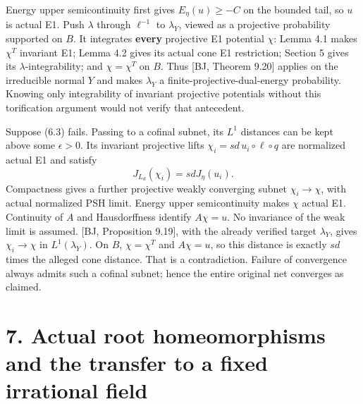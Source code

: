 \documentclass[
  10pt,
]{article}
\begin{document}
Energy upper semicontinuity first gives \(E_\eta(u)\geq-C\) on the
bounded tail, so \(u\) is actual E1. Push \(\lambda\) through
\(\ell^{-1}\) to \(\lambda_Y\), viewed as a projective probability
supported on \(B\). It integrates \textbf{every} projective E1 potential
\(\chi\): Lemma 4.1 makes \(\chi^T\) invariant E1; Lemma 4.2 gives its
actual cone E1 restriction; Section 5 gives its
\(\lambda\)-integrability; and \(\chi=\chi^T\) on \(B\). Thus {[}BJ,
Theorem 9.20{]} applies on the irreducible normal \(Y\) and makes
\(\lambda_Y\) a finite-projective-dual-energy probability. Knowing only
integrability of invariant projective potentials without this
torification argument would not verify that antecedent.

Suppose (6.3) fails. Passing to a cofinal subnet, its \(L^1\) distances
can be kept above some \(\epsilon>0\). Its invariant projective lifts
\(\chi_i=sd\,u_i\circ\ell\circ q\) are normalized actual E1 and satisfy
\[
                         J_{L_d}(\chi_i)=sdJ_\eta(u_i).
\] Compactness gives a further projective weakly converging subnet
\(\chi_i\to\chi\), with actual normalized PSH limit. Energy upper
semicontinuity makes \(\chi\) actual E1. Continuity of \(A\) and
Hausdorffness identify \(A\chi=u\). No invariance of the weak limit is
assumed. {[}BJ, Proposition 9.19{]}, with the already verified target
\(\lambda_Y\), gives \(\chi_i\to\chi\) in \(L^1(\lambda_Y)\). On \(B\),
\(\chi=\chi^T\) and \(A\chi=u\), so this distance is exactly \(sd\)
times the alleged cone distance. That is a contradiction. Failure of
convergence always admits such a cofinal subnet; hence the entire
original net converges as claimed.

\section{7. Actual root homeomorphisms and the transfer to a fixed
irrational
field}\label{actual-root-homeomorphisms-and-the-transfer-to-a-fixed-irrational-field}
\end{document}
